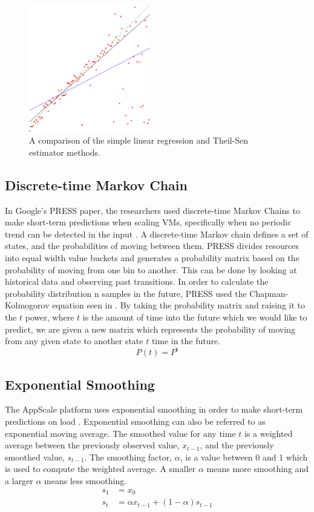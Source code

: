 \begin{figure}
\centering
\includegraphics[width=200px]{diagrams/theilsen.png}
\caption{A comparison of the simple linear regression and Theil-Sen estimator methods.}
\label{fig:regressioncmp}
\end{figure}

\subsection{Discrete-time Markov Chain}
\label{sec:chains}
In Google's PRESS paper, the researchers used discrete-time Markov Chains \cite{statistics} to make short-term predictions when scaling VMs, specifically when no periodic trend can be detected in the input \cite{gong2010press}. A discrete-time Markov chain defines a set of states, and the probabilities of moving between them. PRESS divides resources into equal width value buckets and generates a probability matrix based on the probability of moving from one bin to another. This can be done by looking at historical data and observing past transitions. In order to calculate the probability distribution n samples in the future, PRESS used the Chapman-Kolmogorov equation \cite{statistics} seen in . By taking the probability matrix and raising it to the $t$ power, where $t$ is the amount of time into the future which we would like to predict, we are given a new matrix which represents the probability of moving from any given state to another state $t$ time in the future.
\begin{equation}
\label{eq:ckeq}
P(t) = P^t
\end{equation}

\subsection{Exponential Smoothing}
The AppScale platform uses exponential smoothing in order to make short-term predictions on load \cite{bunch2012pluggable}. Exponential smoothing \cite{statistics} can also be referred to as exponential moving average. The smoothed value for any time $t$ is a weighted average between the previously observed value, $x_{t-1}$, and the previously smoothed value, $s_{t-1}$. The smoothing factor, $\alpha$, is a value between 0 and 1 which is used to compute the weighted average. A smaller $\alpha$ means more smoothing and a larger $\alpha$ means less smoothing.
\begin{equation}
\begin{split}
s_1& = x_0\\
s_t& = \alpha x_{t-1} + (1 - \alpha) s_{t-1}
\end{split}
\end{equation}

